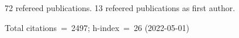 72 refereed publications. 13 refeered publications as first author.

Total citations~=~2497; h-index~=~26 (2022-05-01)